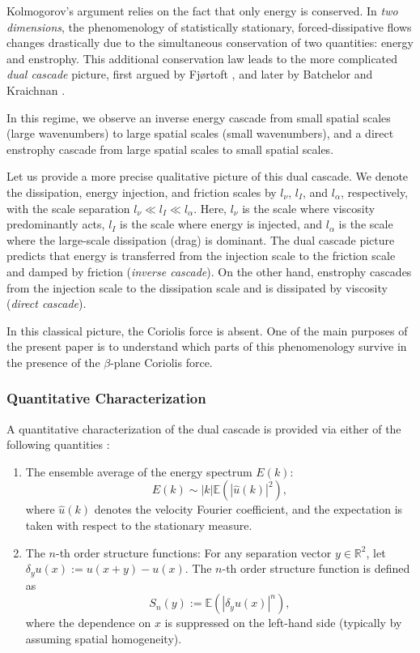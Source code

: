 \documentclass[11pt,a4paper]{article}
\numberwithin{equation}{section}
\numberwithin{theorem}{section}
\numberwithin{remark}{section}
\numberwithin{definition}{section}
\begin{document}
Kolmogorov's argument relies on the fact that only energy is conserved. In \emph{two dimensions}, the phenomenology of statistically stationary, forced-dissipative flows changes drastically due to the simultaneous conservation of two quantities: energy and enstrophy. This additional conservation law leads to the more complicated \emph{dual cascade} picture, first argued by Fjørtoft \cite{Fjrtoft}, and later by Batchelor and Kraichnan \cite{Batchelor2,Kraichnan,Kraichnan2}. 

In this regime, we observe an inverse energy cascade from small spatial scales (large wavenumbers) to large spatial scales (small wavenumbers), and a direct enstrophy cascade from large spatial scales to small spatial scales. 
  
Let us provide a more precise qualitative picture of this dual cascade. We denote the dissipation, energy injection, and friction scales by $l_\nu$, $l_I$, and $l_\alpha$, respectively, with the scale separation $l_\nu \ll l_I \ll l_\alpha$. Here, $l_\nu$ is the scale where viscosity predominantly acts, $l_I$ is the scale where energy is injected, and $l_\alpha$ is the scale where the large-scale dissipation (drag) is dominant. The dual cascade picture predicts that energy is transferred from the injection scale to the friction scale and damped by friction (\emph{inverse cascade}). On the other hand, enstrophy cascades from the injection scale to the dissipation scale and is dissipated by viscosity (\emph{direct cascade}).
 
In this classical picture, the Coriolis force is absent. One of the main purposes of the present paper is to understand which parts of this phenomenology survive in the presence of the \(\beta\)-plane Coriolis force.


\subsubsection{Quantitative Characterization}

A quantitative characterization of the dual cascade is provided via either of the following quantities \cite{frisch}:
\begin{enumerate}
    \item The ensemble average of the energy spectrum $E(k)$:
\begin{equation}
    E(k) \sim |k|\mathbb{E} (|\hat{u}(k)|^2),
\end{equation}
where $\hat{u}(k)$ denotes the velocity Fourier coefficient, and the expectation is taken with respect to the stationary measure.

\item The $n$-th order structure functions: For any separation vector $y \in \mathbb{R}^2$, let $\delta_{y}u(x):=u(x+y)-u(x)$. The $n$-th order structure function is defined as
\begin{equation}
    S_n(y) := \mathbb{E}(|\delta_yu(x)|^n),
\end{equation}
where the dependence on $x$ is suppressed on the left-hand side (typically by assuming spatial homogeneity). 
\end{enumerate}
\end{document}
